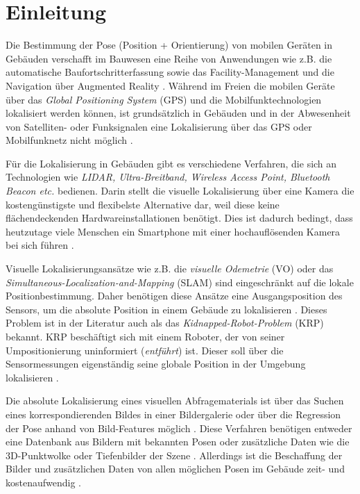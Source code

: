 
\section{Einleitung}
Die Bestimmung der Pose (Position + Orientierung) von mobilen Geräten in Gebäuden verschafft im Bauwesen eine Reihe von Anwendungen wie z.B. die automatische Baufortschritterfassung sowie das Facility-Management und die Navigation über Augmented Reality \cite{kroppModelbasedPoseEstimation2016, kochNaturalMarkersAugmented2014}.
Während im Freien die mobilen Geräte über das \textit{Global Positioning System} (GPS) und die Mobilfunktechnologien lokalisiert werden können, ist grundsätzlich in Gebäuden und in der Abwesenheit von Satelliten- oder Funksignalen eine Lokalisierung über das GPS oder Mobilfunknetz nicht möglich \cite{yassinRecentAdvancesIndoor2016}. 

Für die Lokalisierung in Gebäuden gibt es verschiedene Verfahren, die sich an Technologien wie \textit{LIDAR, Ultra-Breitband, Wireless Access Point, Bluetooth Beacon etc.} bedienen. Darin stellt die visuelle Lokalisierung über eine Kamera die kostengünstigste und flexibelste Alternative dar, weil diese keine flächendeckenden Hardwareinstallationen benötigt. Dies ist dadurch bedingt, dass heutzutage viele Menschen ein Smartphone mit einer hochauflösenden Kamera bei sich führen \cite{wuImagebasedCameraLocalization2018}.

Visuelle Lokalisierungsansätze wie z.B. die 
\textit{visuelle Odemetrie} (VO) oder das \textit{Simulta\-neous-Localization-and-Mapping} (SLAM) sind eingeschränkt auf die lokale Positionbestimmung. Daher benötigen diese Ansätze eine Ausgangsposition des Sensors, um die absolute Position in einem Gebäude zu lokalisieren \cite{stephenseGlobalLocalizationUsing2002}. Dieses Problem ist in der Literatur auch als das \textit{Kidnapped-Robot-Problem} (KRP) bekannt. KRP beschäftigt sich mit einem Roboter, der von seiner Umpositionierung uninformiert (\textit{entführt}) ist. Dieser soll über die Sensormessungen eigenständig seine globale Position in der Umgebung lokalisieren \cite{acharyaBIMPoseNetIndoorCamera2019}.


Die absolute Lokalisierung eines visuellen Abfragematerials ist über das Suchen eines korrespondierenden Bildes in einer Bildergalerie oder über die Regression der Pose anhand von Bild-Features möglich \cite{piascoSurveyVisualBasedLocalization2018}. Diese Verfahren benötigen entweder eine Datenbank aus Bildern mit bekannten Posen \cite{zhangImageBasedLocalization2006, arandjelovicThreeThingsEveryone2012} oder zusätzliche Daten wie die 3D-Punktwolke \cite{irscharaStructurefrommotionPointClouds2009, liWorldwidePoseEstimation2012} oder Tiefenbilder der Szene \cite{shottonSceneCoordinateRegression2013}. Allerdings ist die Beschaffung der Bilder und zusätzlichen Daten von allen möglichen Posen im Gebäude zeit- und kostenaufwendig \cite{acharyaBIMPoseNetIndoorCamera2019}.



